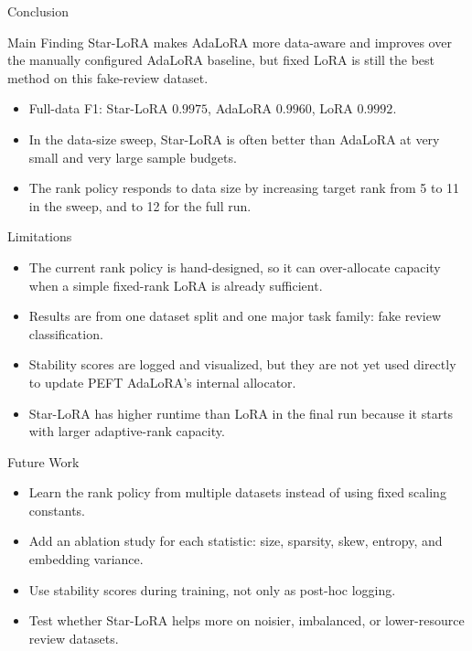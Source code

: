 \begin{frame}{Conclusion}
\begin{block}{Main Finding}
Star-LoRA makes AdaLoRA more data-aware and improves over the manually configured AdaLoRA baseline, but fixed LoRA is still the best method on this fake-review dataset.
\end{block}

\vspace{6pt}
\begin{itemize}
  \item Full-data F1: Star-LoRA \(0.9975\), AdaLoRA \(0.9960\), LoRA \(0.9992\).
  \item In the data-size sweep, Star-LoRA is often better than AdaLoRA at very small and very large sample budgets.
  \item The rank policy responds to data size by increasing target rank from 5 to 11 in the sweep, and to 12 for the full run.
\end{itemize}
\end{frame}

\begin{frame}{Limitations}
\begin{itemize}
  \item The current rank policy is hand-designed, so it can over-allocate capacity when a simple fixed-rank LoRA is already sufficient.
  \item Results are from one dataset split and one major task family: fake review classification.
  \item Stability scores are logged and visualized, but they are not yet used directly to update PEFT AdaLoRA's internal allocator.
  \item Star-LoRA has higher runtime than LoRA in the final run because it starts with larger adaptive-rank capacity.
\end{itemize}
\end{frame}

\begin{frame}{Future Work}
\begin{itemize}
  \item Learn the rank policy from multiple datasets instead of using fixed scaling constants.
  \item Add an ablation study for each statistic: size, sparsity, skew, entropy, and embedding variance.
  \item Use stability scores during training, not only as post-hoc logging.
  \item Test whether Star-LoRA helps more on noisier, imbalanced, or lower-resource review datasets.
\end{itemize}
\end{frame}

